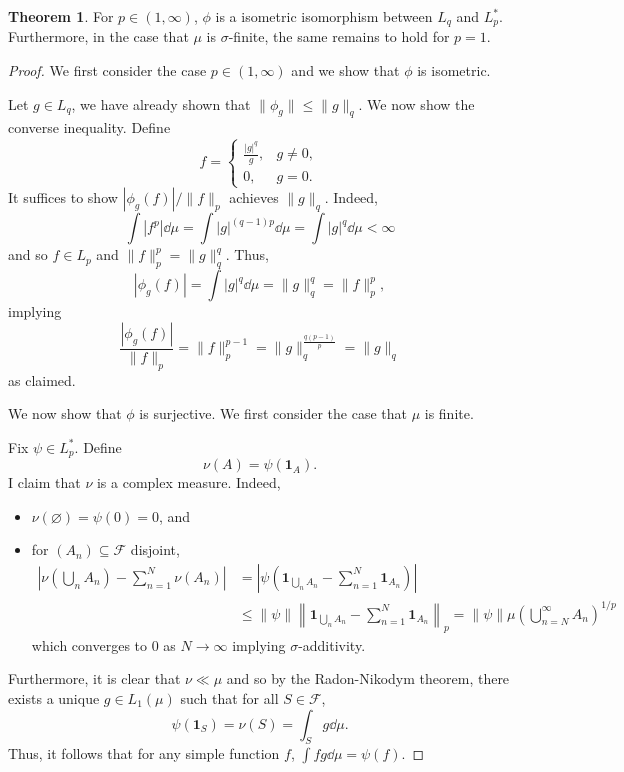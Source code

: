 \documentclass[]{article}
\theoremstyle{definition}
\newtheorem{theorem}{Theorem}
\begin{document}
\begin{theorem}
  For \(p \in (1, \infty)\), \(\phi\) is a isometric isomorphism between \(L_q\) and \(L_p^*\).
  Furthermore, in the case that \(\mu\) is \(\sigma\)-finite, the same remains to hold for \(p = 1\).
\end{theorem}
\begin{proof}
  We first consider the case \(p \in (1, \infty)\) and we show that \(\phi\) is isometric. 
  
  Let \(g \in L_q\), we have already shown that \(\|\phi_g\| \le \|g\|_q\). We now show the converse 
  inequality. Define 
  \[f = \begin{cases}
    \frac{|g|^q}{g}, & g \neq 0,\\
    0, & g = 0.
  \end{cases}\]
  It suffices to show \(|\phi_g(f)| / \|f\|_p\) achieves \(\|g\|_q\). Indeed,
  \[\int |f^p| \dd \mu = \int |g|^{(q - 1)p} \dd \mu = \int |g|^q \dd \mu < \infty\]
  and so \(f \in L_p\) and \(\|f\|_p^p = \|g\|_q^q\). Thus, 
  \[|\phi_g(f)| = \int |g|^q \dd\mu = \|g\|_q^q = \|f\|_p^p,\]
  implying 
  \[\frac{|\phi_g(f)|}{\|f\|_p} = \|f\|_p^{p - 1} = \|g\|_q^{\frac{q(p - 1)}{p}} = \|g\|_q\]
  as claimed.

  We now show that \(\phi\) is surjective. We first consider the case that \(\mu\) is finite.

  Fix \(\psi \in L_p^*\). Define 
  \[\nu(A) = \psi(\mathbf{1}_A).\]
  I claim that \(\nu\) is a complex measure. Indeed, 
  \begin{itemize}
    \item \(\nu(\varnothing) = \psi(0) = 0\), and
    \item for \((A_n) \subseteq \mathcal{F}\) disjoint,
    \begin{align*}
      \left|\nu\left(\bigcup_n A_n\right) - \sum_{n = 1}^N \nu(A_n)\right| 
      & = \left|\psi\left(\mathbf{1}_{\bigcup_n A_n} - \sum_{n = 1}^N \mathbf{1}_{A_n}\right)\right|\\
      & \le \|\psi\| \left\|\mathbf{1}_{\bigcup_n A_n} - \sum_{n = 1}^N \mathbf{1}_{A_n}\right\|_p
        = \|\psi\| \mu\left(\bigcup_{n = N}^\infty A_n\right)^{1 / p}
    \end{align*}
      which converges to \(0\) as \(N \to \infty\) implying \(\sigma\)-additivity.
  \end{itemize}
  Furthermore, it is clear that \(\nu \ll \mu\) and so by the Radon-Nikodym theorem, there exists 
  a unique \(g \in L_1(\mu)\) such that for all \(S \in \mathcal{F}\), 
  \[\psi(\mathbf{1}_S) = \nu(S) = \int_S g \dd \mu.\]
  Thus, it follows that for any simple function \(f\), \(\int fg \dd \mu = \psi(f)\). 


\end{proof}
\end{document}
